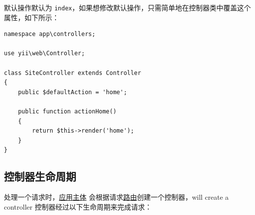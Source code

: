 默认操作默认为 \lstinline|index|，如果想修改默认操作，只需简单地在控制器类中覆盖这个属性，如下所示：

\lstset{language=php}\begin{lstlisting}
namespace app\controllers;

use yii\web\Controller;

class SiteController extends Controller
{
    public $defaultAction = 'home';

    public function actionHome()
    {
        return $this->render('home');
    }
}
\end{lstlisting}
\subsection{控制器生命周期 \label{structure-controllers.md::controller-lifecycle}}
处理一个请求时，\hyperref[structure-applications.md]{应用主体} 会根据请求\hyperref[structure-controllers.md::::routes]{路由}创建一个控制器，will create a controller
控制器经过以下生命周期来完成请求：

